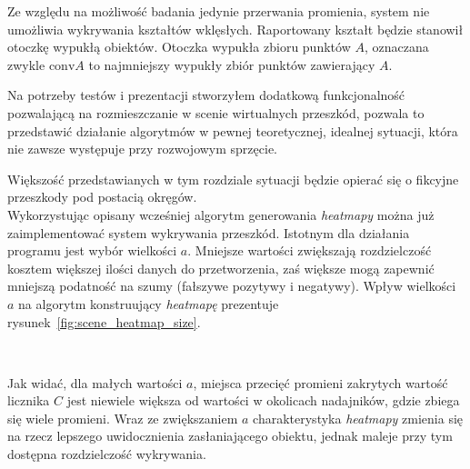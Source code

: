 Ze względu na możliwość badania jedynie przerwania promienia, system nie umożliwia wykrywania kształtów wklęsłych. Raportowany kształt będzie stanowił otoczkę wypukłą obiektów.
Otoczka wypukła zbioru punktów $A$, oznaczana zwykle $\mbox{conv} A$ to najmniejszy wypukły zbiór punktów zawierający $A$.\\

\clearpage

Na potrzeby testów i prezentacji stworzyłem dodatkową funkcjonalność pozwalającą na rozmieszczanie w scenie wirtualnych przeszkód, pozwala to przedstawić działanie algorytmów w pewnej teoretycznej, idealnej sytuacji, która nie zawsze występuje przy rozwojowym sprzęcie.

Większość przedstawianych w tym rozdziale sytuacji będzie opierać się o fikcyjne przeszkody pod postacią okręgów.\\

Wykorzystując opisany wcześniej algorytm generowania \textit{heatmapy} można już zaimplementować system wykrywania przeszkód. Istotnym dla działania programu jest wybór wielkości $a$. Mniejsze wartości zwiększają rozdzielczość kosztem większej ilości danych do przetworzenia, zaś większe mogą zapewnić mniejszą podatność na szumy (fałszywe pozytywy i negatywy). Wpływ wielkości $a$ na algorytm konstruujący \textit{heatmapę} prezentuje rysunek~\ref{fig:scene_heatmap_size}.

\begin{sidewaysfigure}[tbh]
  \myfloatalign
  \vspace{0.085\textheight}
   \quad
   \\
   \quad
  \caption[Wpływ wielkości $a$ na algorytm konstrukcji heatmapy.]{Wpływ wielkości $a$ na algorytm konstrukcji heatmapy.}\label{fig:scene_heatmap_size}
\end{sidewaysfigure}


Jak widać, dla małych wartości $a$, miejsca przecięć promieni zakrytych wartość licznika $C$ jest niewiele większa od wartości w okolicach nadajników, gdzie zbiega się wiele promieni. Wraz ze zwiększaniem $a$ charakterystyka \textit{heatmapy} zmienia się na rzecz lepszego uwidocznienia zasłaniającego obiektu, jednak maleje przy tym dostępna rozdzielczość wykrywania.\\

